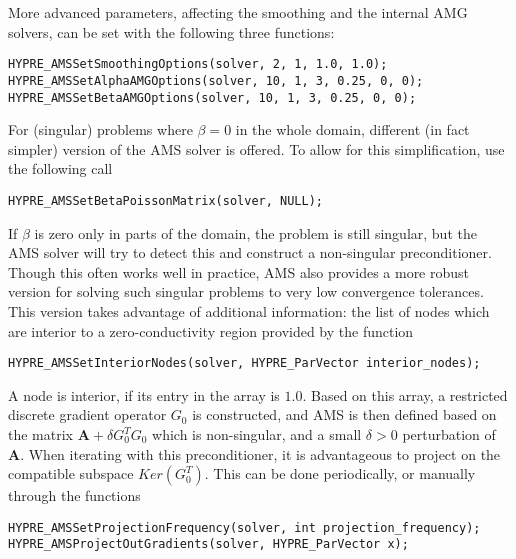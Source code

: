 More advanced parameters, affecting the smoothing and the
internal AMG solvers, can be set with the following three
functions:
\begin{display}\begin{verbatim}
HYPRE_AMSSetSmoothingOptions(solver, 2, 1, 1.0, 1.0);
HYPRE_AMSSetAlphaAMGOptions(solver, 10, 1, 3, 0.25, 0, 0);
HYPRE_AMSSetBetaAMGOptions(solver, 10, 1, 3, 0.25, 0, 0);
\end{verbatim}\end{display}

For (singular) problems where $\beta = 0$ in the whole domain,
different (in fact simpler) version of the AMS solver is offered.
To allow for this simplification, use the following \hypre{} call
\begin{display}\begin{verbatim}
HYPRE_AMSSetBetaPoissonMatrix(solver, NULL);
\end{verbatim}\end{display}

If $\beta$ is zero only in parts of the domain, the problem is still singular,
but the AMS solver will try to detect this and construct a non-singular
preconditioner. Though this often works well in practice, AMS also provides a
more robust version for solving such singular problems to very low convergence
tolerances. This version takes advantage of additional information: the list of
nodes which are interior to a zero-conductivity region provided by the function
\begin{display}\begin{verbatim}
HYPRE_AMSSetInteriorNodes(solver, HYPRE_ParVector interior_nodes);
\end{verbatim}\end{display}
A node is interior, if its entry in the  array is $1.0$.
Based on this array, a restricted discrete gradient
operator $G_0$ is constructed, and AMS is then defined based on the matrix
${\mathbf A}+\delta G_0^TG_0$ which is non-singular, and a small $\delta>0$ perturbation of
${\mathbf A}$. When iterating with this preconditioner, it is advantageous to project on
the compatible subspace $Ker(G_0^T)$. This can be done periodically, or manually
through the functions
\begin{display}\begin{verbatim}
HYPRE_AMSSetProjectionFrequency(solver, int projection_frequency);
HYPRE_AMSProjectOutGradients(solver, HYPRE_ParVector x);
\end{verbatim}\end{display}

